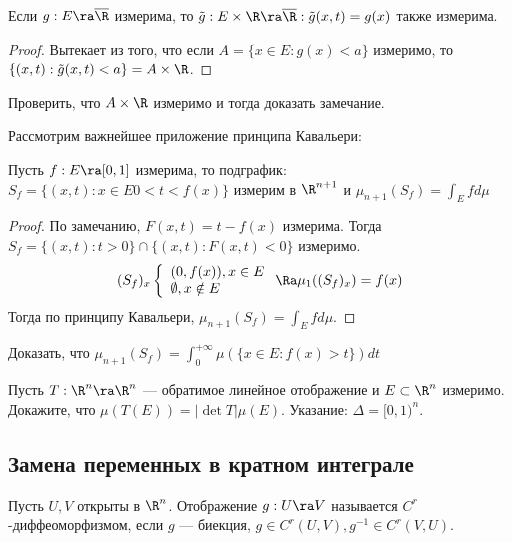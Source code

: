
\begin{note}
    Если \(g: E \ra \overline{\R}\) измерима, то \(\tilde{g}: E \times \R \ra \overline{\R}: \tilde{g}(x, t) = g(x)\) также измерима.
\end{note}
\begin{proof}
    Вытекает из того, что если \(A = \{x \in E: g(x) < a\}\) измеримо, то \(\{(x, t): \tilde{g}(x, t) < a\} = A \times \R\).
\end{proof}
\begin{problem}
    Проверить, что \(A \times \R\) измеримо и тогда доказать замечание.
\end{problem}

Рассмотрим важнейшее приложение принципа Кавальери:
\begin{corollary}
    Пусть \(f: E \ra [0, 1]\) измерима, то подграфик: \(S_f = \{(x, t): x \in E 0 < t < f(x)\}\) измерим в \(\R^{n + 1}\) и \(\mu_{n + 1}(S_f) = \int_E f d\mu\)
\end{corollary}
\begin{proof}
    По замечанию, \(F(x, t) = t - f(x)\) измерима. Тогда \(S_f = \{(x, t): t > 0\} \cap \{(x, t): F(x, t) < 0\}\) измеримо.
    \[(S_f)_x\left\{\begin{array}{l}
        (0, f(x)), x \in E \\
        \emptyset, x \notin E
    \end{array}\right. \Ra \mu_1((S_f)_x) = f(x)\]
    Тогда по принципу Кавальери, \(\mu_{n + 1}(S_f) = \int_E f d\mu\).
\end{proof}

\begin{problem}
    Доказать, что \(\mu_{n + 1}(S_f) = \int_0^{+\infty} \mu(\{x \in E: f(x) > t\})dt\)
\end{problem}

\begin{problem}
    Пусть \(T: \R^n \ra \R^n\) --- обратимое линейное отображение и \(E \subset \R^n\) измеримо. Докажите, что \(\mu(T(E)) = |\det T|\mu(E)\). Указание: \(\Delta = [0, 1)^n\).
\end{problem}

\subsection{Замена переменных в кратном интеграле}
\begin{definition}
    Пусть \(U, V\) открыты в \(\R^n\). Отображение \(g: U \ra V\) называется \(C^r\)-диффеоморфизмом, если \(g\) --- биекция, \(g \in C^r(U, V), g^{-1} \in C^r(V, U)\).
\end{definition}

